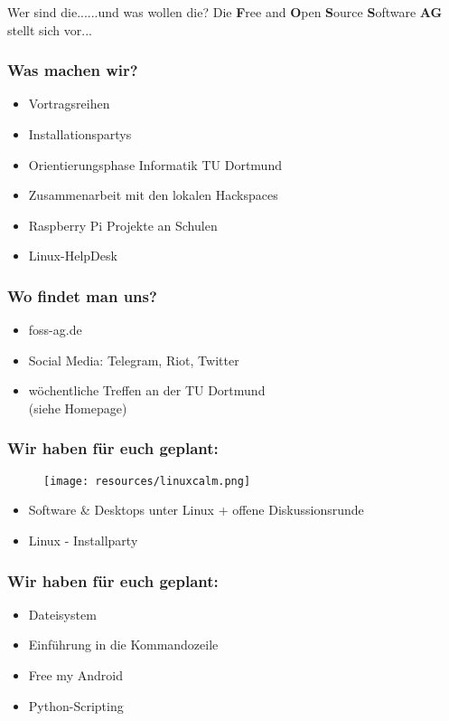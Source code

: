 \begin{frame}{Wer sind die...}{...und was wollen die?}
	Die \textbf{F}ree and \textbf{O}pen \textbf{S}ource \textbf{S}oftware \textbf{AG} stellt sich vor... 
\end{frame}

\begin{frame}
\frametitle{Was machen wir?}
\begin{itemize}
	\item Vortragsreihen
	\item Installationspartys
	\item Orientierungsphase Informatik TU Dortmund
	\item Zusammenarbeit mit den lokalen Hackspaces
	\item Raspberry Pi Projekte an Schulen
	\item Linux-HelpDesk
\end{itemize}
\end{frame}

\begin{frame}
	\frametitle{Wo findet man uns?}
	\begin{itemize}
		\item foss-ag.de
		\item Social Media: Telegram, Riot, Twitter
		\item wöchentliche Treffen an der TU Dortmund\\(siehe Homepage)
	\end{itemize}
\end{frame}

\begin{frame}
\frametitle{Wir haben für euch geplant:}
\begin{figure}
\texttt{[image: resources/linuxcalm.png]}
\end{figure}
	\begin{itemize}
		\item Software \& Desktops unter Linux + offene Diskussionsrunde
		\item Linux - Installparty
	\end{itemize}
\end{frame}

\begin{frame}
\frametitle{Wir haben für euch geplant:}
	\begin{itemize}
		\item Dateisystem
		\item Einführung in die Kommandozeile
		\item Free my Android
		\item Python-Scripting
	\end{itemize}
\end{frame}

